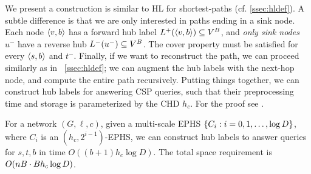 %


We present a construction is similar to HL for shortest-paths (cf. \cref{ssec:hldef}).
A subtle difference is that we are only interested in paths ending in a sink node.
Each node $\pp{v,b}$ has a forward hub label $\Lf(\pp{v,b})\subseteq V^B$, and \emph{only sink nodes} $u^-$ have a reverse hub $\Lb(u^-)\subseteq V^B$.
The cover property must be satisfied for every $\pp{s,b}$ and $t^-$.
Finally, if we want to reconstruct the path, we can proceed similarly as in ~\cref{ssec:hldef}; we can augment the hub labels with the next-hop node, and compute the entire path recursively.
Putting things together, we can construct hub labels for answering CSP queries, such that their preprocessing time and storage is parameterized by the CHD $h_c$.
For the proof see \cite{TechReport}.

\begin{theorem}
	\label{theo:HLeff}
	For a network $(G,\ell,c)$, given a multi-scale EPHS $\crl*{C_i:i=0,1,\ldots,\log D}$, where $C_i$ is an $(h_c,2^{i-1})$-EPHS, we can construct hub labels 
	to answer queries for $s,t,b$ in time $O((b+1) h_c\log D)$.
	The total space requirement is $\Or(nB \cdot Bh_c\log D)$.
\end{theorem}

